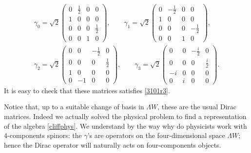 \begin{equation}
	\begin{split}
		\gamma_0=\sqrt{2}\begin{pmatrix}
			                 0 & \frac{1}{2} & 0 & 0           \\
			                 1 & 0           & 0 & 0           \\
			                 0 & 0           & 0 & \frac{1}{2} \\
			                 0 & 0           & 1 & 0
		                 \end{pmatrix}, \qquad
		\gamma_1=\sqrt{2}\left(\begin{matrix}
				                       0 & -\frac{1}{2} & 0 & 0            \\
				                       1 & 0            & 0 & 0            \\
				                       0 & 0            & 0 & -\frac{1}{2} \\
				                       0 & 0            & 1 & 0
			                       \end{matrix}\right), \\
		\gamma_2=\sqrt{2}\begin{pmatrix}
			                 0 & 0  & -\frac{1}{2} & 0           \\
			                 0 & 0  & 0            & \frac{1}{2} \\
			                 1 & 0  & 0            & 0           \\
			                 0 & -1 & 0            & 0
		                 \end{pmatrix},\qquad
		\gamma_3=\sqrt{2}\begin{pmatrix}
			                 0  & 0 & -\frac{i}{2} & 0           \\
			                 0  & 0 & 0            & \frac{i}{2} \\
			                 -i & 0 & 0            & 0           \\
			                 0  & i & 0            & 0
		                 \end{pmatrix}.
	\end{split}
\end{equation}
It is easy to check that these matrices satisfies \eqref{3101r3}.

Notice that, up to a suitable change of basis in $\Lambda W $, these are the usual Dirac matrices. Indeed we actually solved the physical problem to find a representation of the algebra \eqref{cliffphys}.  We understand by the way why do physicists work with $4$-components spinors: the $\gamma$'s are operators on the four-dimensional space $\Lambda W$; hence the Dirac operator will naturally acts on four-components objects.

